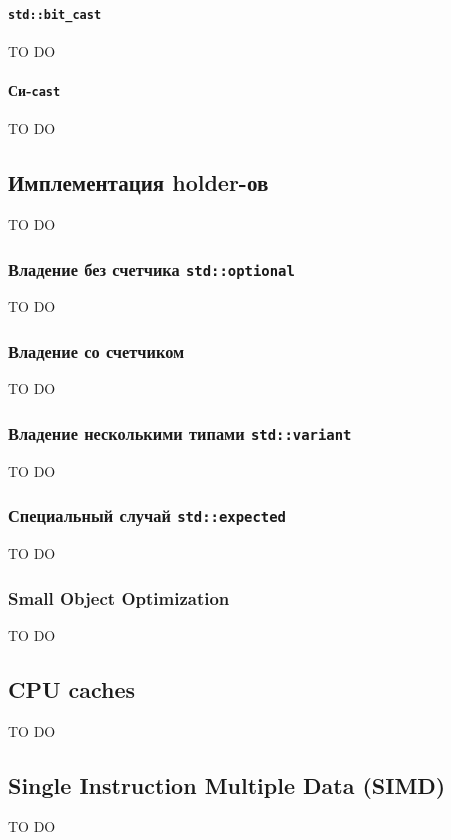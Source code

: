 \documentclass{article}
\begin{document}
\paragraph{\texttt{std::bit\_cast}}
TO DO

\paragraph{Си-\texttt{cast}}
TO DO

\subsection{Имплементация holder-ов}

TO DO

\subsubsection{Владение без счетчика \texttt{std::optional}}
TO DO

\subsubsection{Владение со счетчиком}
TO DO

\subsubsection{Владение несколькими типами \texttt{std::variant}}
TO DO

\subsubsection{Специальный случай \texttt{std::expected}}
TO DO

\subsubsection{Small Object Optimization}
TO DO


\subsection{CPU caches}

TO DO

\subsection{Single Instruction Multiple Data (SIMD)}

TO DO
\end{document}
